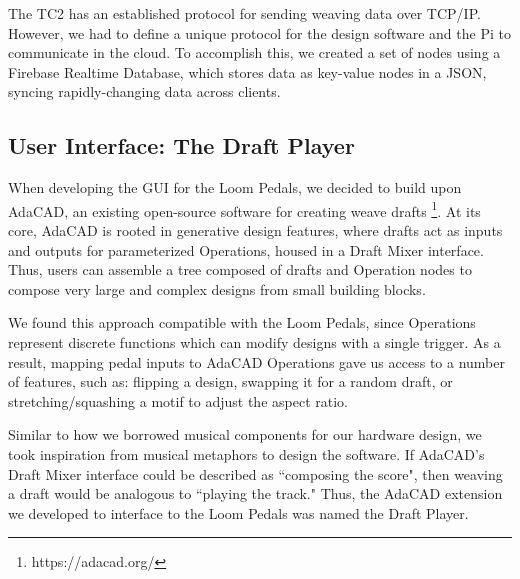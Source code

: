 The TC2 has an established protocol for sending weaving data over TCP/IP. However, we had to define a unique protocol for the design software and the Pi to communicate in the cloud. To accomplish this, we created a set of nodes using a Firebase Realtime Database, which stores data as key-value nodes in a JSON, syncing rapidly-changing data across clients.

\subsection{User Interface: The Draft Player}

When developing the GUI for the Loom Pedals, we decided to build upon AdaCAD, an existing open-source software for creating weave drafts \footnote{https://adacad.org/}. At its core, AdaCAD is rooted in generative design features, where drafts act as inputs and outputs for parameterized Operations, housed in a Draft Mixer interface. Thus, users can assemble a tree composed of drafts and Operation nodes to compose very large and complex designs from small building blocks. 

We found this approach compatible with the Loom Pedals, since Operations represent discrete functions which can modify designs with a single trigger. As a result, mapping pedal inputs to AdaCAD Operations gave us access to a number of features, such as: flipping a design, swapping it for a random draft, or stretching/squashing a motif to adjust the aspect ratio. 

Similar to how we borrowed musical components for our hardware design, we took inspiration from musical metaphors to design the software. If AdaCAD’s Draft Mixer interface could be described as “composing the score", then weaving a draft would be analogous to “playing the track." Thus, the AdaCAD extension we developed to interface to the Loom Pedals was named the Draft Player. 

